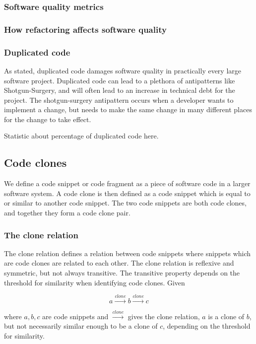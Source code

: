 \documentclass[12pt]{article}
\begin{document}
\subsubsection{Software quality metrics}

\subsubsection{How refactoring affects software quality}

\subsubsection{Duplicated code}

As stated, duplicated code damages software quality in practically every large software
project. Duplicated code can lead to a plethora of antipatterns like Shotgun-Surgery, and
will often lead to an increase in technical debt for the
project\cite[99]{fowlerrefactoring}. The shotgun-surgery antipattern occurs when a
developer wants to implement a change, but needs to make the same change in many different
places for the change to take effect.

Statistic about percentage of duplicated code here.

\subsection{Code clones}

We define a code snippet or code fragment as a piece of software code in a larger software
system. A code clone is then defined as a code snippet which is equal to or similar to
another code snippet. The two code snippets are both code clones, and together they form a
code clone pair.

\subsubsection{The clone relation}
The clone relation defines a relation between code snippets where snippets which are
code clones are related to each other. The clone relation is reflexive and symmetric, but
not always transitive. The transitive property depends on the threshold for similarity when
identifying code clones. Given

$$a \xrightarrow{clone} b \xrightarrow{clone} c$$

where $a,b,c$ are code snippets and $\xrightarrow{clone}$ gives the clone relation, $a$ is
a clone of $b$, but not necessarily similar enough to be a clone of $c$, depending on the
threshold for similarity.
\end{document}
